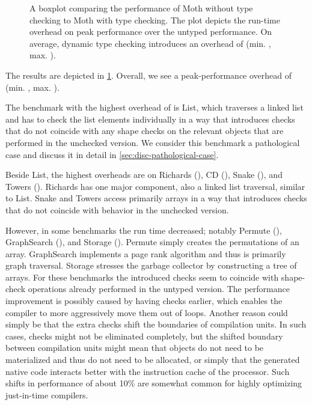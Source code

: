 \begin{figure}
	\TypingOverhead{}
	\caption{A boxplot comparing the performance of Moth without type checking
  to Moth with type checking.
  The plot depicts the run-time overhead on peak performance over
  the untyped performance. On average, dynamic type checking introduces
  an overhead of \OverheadTypingGMeanP (min. \OverheadTypingMinP, max. \OverheadTypingMaxP).}
	\label{fig:typing-overhead}
\end{figure}

The results are depicted in \cref{fig:typing-overhead}.
Overall, we see a peak-performance overhead of 
\OverheadTypingGMeanP (min. \OverheadTypingMinP, max. \OverheadTypingMaxP).


The benchmark with the highest overhead of \OverheadListP is List,
which traverses a linked list and has to check the list elements individually
in a way that introduces checks that do not coincide with any shape checks
on the relevant objects that are performed in the unchecked version.
We consider this benchmark a pathological case and discuss it
in detail in \cref{sec:disc-pathological-case}.

Beside List, the highest overheads are on
Richards (\OverheadRichardsP), CD (\OverheadCDP), 
Snake (\OverheadSnakeP), and Towers (\OverheadTowersP).
Richards has one major component, also a linked list traversal,
similar to List.
Snake and Towers access primarily arrays in a way that introduces checks
that do not coincide with behavior in the unchecked version.


However, in some benchmarks the run time decreased; notably Permute (\OverheadPermuteP),
GraphSearch (\OverheadGraphSearchP), and Storage (\OverheadStorageP).
Permute simply creates the permutations of an array.
GraphSearch implements a page rank algorithm
and thus is primarily graph traversal.
Storage stresses the garbage collector by constructing a tree of arrays.
For these benchmarks the introduced checks seem to coincide with shape-check operations
already performed in the untyped version.
The performance improvement is possibly caused by having checks earlier,
which enables the compiler to more aggressively move them out of loops.
Another reason could simply be that the extra checks shift the boundaries
of compilation units.
In such cases, checks might not be eliminated completely,
but the shifted boundary between compilation units might mean that
objects do not need to be materialized and thus do not need to be allocated,
or simply that the generated native code interacts better with
the instruction cache of the processor.
Such shifts in performance of about 10\%
are somewhat common for highly optimizing just-in-time compilers.

